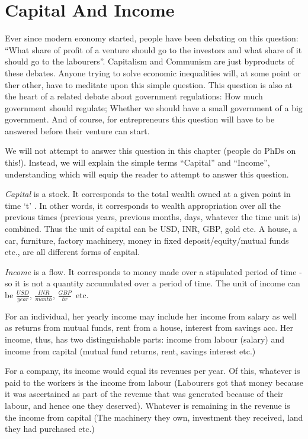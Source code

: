 \chapter{Capital And Income}
Ever since modern economy started, people have been debating on this question: ``What share of profit of a venture should go to the investors and what share of it should go to the labourers''. Capitalism and Communism are just byproducts of these debates. Anyone trying to solve economic inequalities will, at some point or ther other, have to meditate upon this simple question. This question is also at the heart of a related debate about government regulations: How much government should regulate; Whether we should have a small government of a big government. And of course, for entrepreneurs this question will have to be answered before their venture can start. 

We will not attempt to answer this question in this chapter (people do PhDs on this!). Instead, we will explain the simple terms ``Capital'' and ``Income'', understanding which will equip the reader to attempt to answer this question.

\emph{Capital} is a stock. It corresponds to the total wealth owned at a given point in time `t' . In other words, it corresponds to wealth appropriation over all the previous times (previous years, previous months, days, whatever the time unit is) combined. Thus the unit of capital can be  USD, INR, GBP, gold  etc. A house, a car, furniture, factory machinery, money in fixed deposit/equity/mutual funds etc., are all different forms of capital. 

\emph{Income} is a flow. It corresponds to money made over a stipulated period of time - so it is not a quantity accumulated over a period of time. The unit of income can be $\frac{USD}{year}$,  $\frac{INR}{month}$, $\frac{GBP}{hr}$\ etc.

For an individual, her yearly income may include her income from salary as well as returns from mutual funds, rent from a house, interest from savings acc. Her income, thus, has two distinguishable parts: income from labour (salary) and income from capital (mutual fund returns, rent, savings interest etc.)

For a company, its income would equal its revenues per year. Of this, whatever is paid to the workers is the income from labour (Labourers got that money because it was ascertained as part of the revenue that was generated because of their labour, and hence one they deserved). Whatever is remaining in the revenue is the income from capital (The machinery they own, investment they received, land they had purchased etc.)

